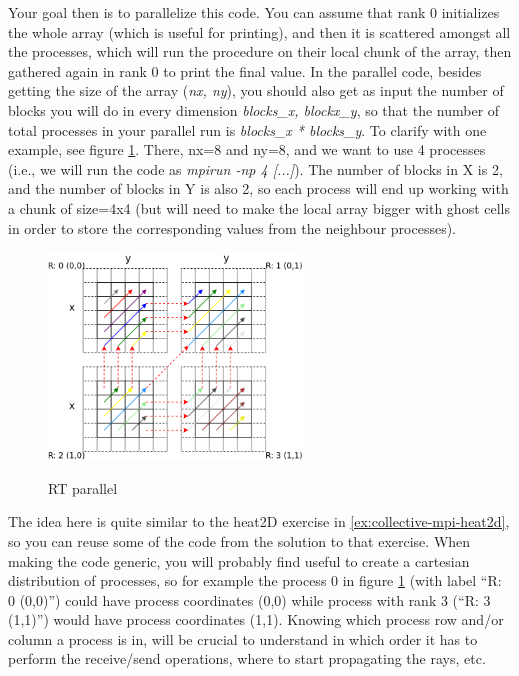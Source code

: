 Your goal then is to parallelize this code. You can assume that rank 0
initializes the whole array (which is useful for printing), and then it is
scattered amongst all the processes, which will run the procedure
 on their local chunk of the array, then gathered again in
rank 0 to print the final value. In the parallel code, besides getting the size
of the array (\textit{nx, ny}), you should also get as input the number of
blocks you will do in every dimension \textit{blocks\_x, blockx\_y}, so that the
number of total processes in your parallel run is \textit{blocks\_x *
  blocks\_y}. To clarify with one example, see figure \ref{fig:rt-par}. There,
nx=8 and ny=8, and we want to use 4 processes (i.e., we will run the code as
\textit{mpirun -np 4 [...]}). The number of blocks in X is 2, and the number of
blocks in Y is also 2, so each process will end up working with a chunk of
size=4x4 (but will need to make the local array bigger with ghost cells in order
to store the corresponding values from the neighbour processes).


\begin{figure}[!htbp]
  \centering
  \includegraphics[width=0.6\textwidth]{graphics/projects/rt-par.png}
  \label{fig:rt-par}
  \caption{RT parallel}
\end{figure}

The idea here is quite similar to the heat2D exercise in
\ref{ex:collective-mpi-heat2d}, so you can reuse some of the code from the
solution to that exercise. When making the code generic, you will probably find
useful to create a cartesian distribution of processes, so for example the
process 0 in figure \ref{fig:rt-par} (with label ``R: 0 (0,0)'') could have
process coordinates (0,0) while process with rank 3 (``R: 3 (1,1)'') would have
process coordinates (1,1). Knowing which process row and/or column a process is
in, will be crucial to understand in which order it has to perform the
receive/send operations, where to start propagating the rays, etc.

